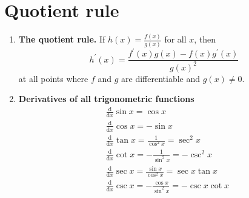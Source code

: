 \section{Quotient rule}
\begin{enumerate}
    \item \textbf{The quotient rule.} If $h(x)=\frac{f(x)}{g(x)}$ for all $x$, then
        $$
        h^\prime (x)=\frac{f^\prime (x)g(x)-f(x)g^\prime (x)}{g(x)^2}
        $$
        at all points where $f$ and $g$ are differentiable and $g(x)\neq 0$.
    \item \textbf{Derivatives of all trigonometric functions}
        \begin{align*}
            & \frac{\mathrm{d}}{\mathrm{d}x}\sin x=\cos x \\
            & \frac{\mathrm{d}}{\mathrm{d}x}\cos x=-\sin x \\
            & \frac{\mathrm{d}}{\mathrm{d}x}\tan x=\frac{1}{\cos^2 x}=\sec^2 x \\
            & \frac{\mathrm{d}}{\mathrm{d}x}\cot x=-\frac{1}{\sin^2 x}=-\csc^2 x \\
            & \frac{\mathrm{d}}{\mathrm{d}x}\sec x=\frac{\sin x}{\cos^2 x}=\sec x\tan x \\
            & \frac{\mathrm{d}}{\mathrm{d}x}\csc x=-\frac{\cos x}{\sin^2 x}=-\csc x\cot x
        \end{align*}
\end{enumerate}

